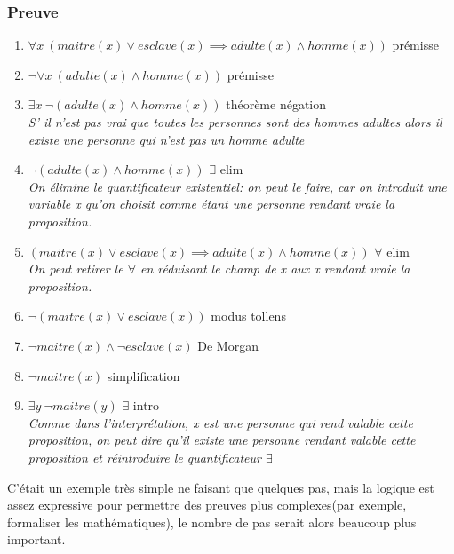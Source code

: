\subsubsection{Preuve}
\begin{enumerate}
    \item $\forall{}x\ (maitre(x)\lor{}esclave(x)\implies{}adulte(x)\land{}homme(x))$ \hfill prémisse
    \item $\lnot{}\forall{}x\ (adulte(x)\land{}homme(x))$ \hfill prémisse
    \item $\exists{}x\ \lnot{}(adulte(x)\land{}homme(x))$ \hfill théorème négation\\
    \textit{S' il n'est pas vrai que toutes les personnes sont des hommes adultes alors il existe une personne qui n'est pas un homme adulte}
    \item $\lnot{}(adulte(x)\land{}homme(x))$ \hfill $\exists{}$ elim\\
\textit{    On élimine le quantificateur existentiel:  on peut le faire, car on introduit une variable x qu'on choisit comme étant une personne rendant vraie la proposition.}
    \item $(maitre(x)\lor{}esclave(x)\implies{}adulte(x)\land{}homme(x))$ \hfill $\forall{}$ elim\\
    \textit{On peut retirer le $\forall$  en réduisant le champ de x aux x rendant vraie la proposition.}
    \item $\lnot{}(maitre(x)\lor{}esclave(x))$ \hfill modus tollens
    \item $\lnot{}maitre(x)\land{}\lnot{}esclave(x)$ \hfill De Morgan
    \item $\lnot{}maitre(x)$ \hfill simplification
    \item $\exists{}y\ \lnot{}maitre(y)$ \hfill $\exists{}$ intro\\
    \textit{Comme dans l'interprétation, x est une personne qui rend valable cette proposition, on peut dire qu'il existe une personne rendant valable cette proposition et réintroduire le quantificateur $\exists$}
\end{enumerate}
C'était un exemple très simple ne faisant que quelques pas, mais la logique est assez expressive pour permettre des preuves plus complexes(par exemple, formaliser les mathématiques), le nombre de pas serait alors beaucoup plus important. 

